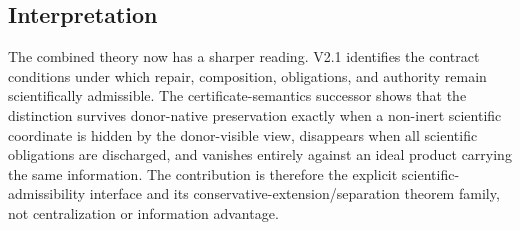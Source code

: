 \subsection{Interpretation}
The combined theory now has a sharper reading. V2.1 identifies the contract conditions under which repair, composition, obligations, and authority remain scientifically admissible. The certificate-semantics successor shows that the distinction survives donor-native preservation exactly when a non-inert scientific coordinate is hidden by the donor-visible view, disappears when all scientific obligations are discharged, and vanishes entirely against an ideal product carrying the same information. The contribution is therefore the explicit scientific-admissibility interface and its conservative-extension/separation theorem family, not centralization or information advantage.
